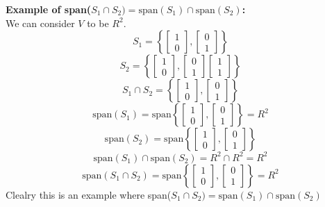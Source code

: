 \documentclass[answers,12pt,addpoints]{exam}
\begin{document}
\begin{questions}
\textbf{Example of span($S_1 \cap S_2) = \text{span}(S_1) \cap \text{span}(S_2)$:}\\
We can consider $V$ to be $R^2$.\\
$$S_1 = \left\{ \begin{bmatrix}
    1\\
    0
\end{bmatrix} ,\begin{bmatrix}
    0\\
    1
\end{bmatrix}\right\}$$
$$S_2 = \left\{ \begin{bmatrix}
    1\\
    0
\end{bmatrix} ,\begin{bmatrix}
    0 \\
    1
\end{bmatrix} \begin{bmatrix}
    1\\
    1
\end{bmatrix}\right\}$$
$$S_1 \cap S_2 = \left\{ \begin{bmatrix}
    1\\
    0
\end{bmatrix} ,\begin{bmatrix}
    0\\
    1
\end{bmatrix}\right\}$$
$$\text{span}(S_1) = \text{span}\left\{ \begin{bmatrix}
    1\\
    0
\end{bmatrix} ,\begin{bmatrix}
    0\\
    1
\end{bmatrix}\right\} = R^2$$
$$\text{span}(S_2) = \text{span}\left\{ \begin{bmatrix}
    1\\
    0
\end{bmatrix} ,\begin{bmatrix}
    0\\
    1
\end{bmatrix} \right\} $$
$$\text{span}(S_1) \cap \text{span}(S_2) = R^2 \cap R^2 = R^2$$
$$\text{span}(S_1 \cap S_2) = \text{span}\left\{ \begin{bmatrix}
    1\\
    0
\end{bmatrix} ,\begin{bmatrix}
    0\\
    1
\end{bmatrix}\right\} = R^2$$
Clealry this is an example where span($S_1 \cap S_2) = \text{span}(S_1) \cap \text{span}(S_2)$\\





\end{questions}
\end{document}
